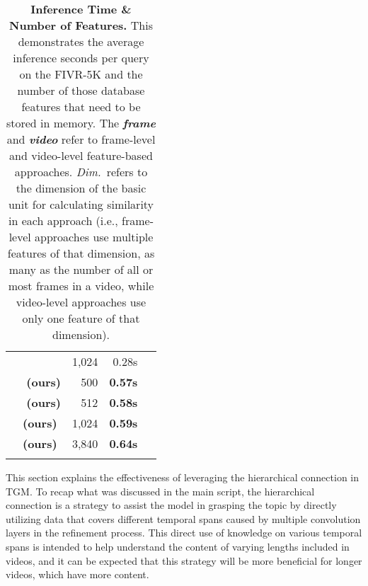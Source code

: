 \documentclass[10pt,twocolumn,letterpaper]{article}
\begin{document}
\begin{table}[!t]
\begin{center}
\begin{tabular}{@{}clrrc@{}}
             & ~\cite{shao2021temporal}  & 1,024 & 0.28s\;\;\;\;\, & \\ \cmidrule(lr){2-4}
             &  \,\,\textbf{(ours)} & 500 & \textbf{0.57s}\;\;\;\;\, &  \\
             &  \,\,\textbf{(ours)} & 512 & \textbf{0.58s}\;\;\;\;\, & \\
             &  \textbf{(ours)} & 1,024 & \textbf{0.59s}\;\;\;\;\, & \\
             &  \textbf{(ours)} & 3,840 & \textbf{0.64s}\;\;\;\;\, &  \\
            \cmidrule[\heavyrulewidth]{1-5}
            \morecmidrules
            \cmidrule[\heavyrulewidth]{1-5} 
            \end{tabular}
            \vspace{-0mm}
            \caption{\textbf{Inference Time \& Number of Features.} This demonstrates the average inference seconds per query on the FIVR-5K and the number of those database features that need to be stored in memory. The \textit{\textbf{frame}} and \textit{\textbf{video}} refer to frame-level and video-level feature-based approaches. \textit{Dim.}~refers to the dimension of the basic unit for calculating similarity in each approach (i.e., frame-level approaches use multiple features of that dimension, as many as the number of all or most frames in a video, while video-level approaches use only one feature of that dimension). \vspace{0mm}} \label{tab:speed_mem}
        \end{center}
    \end{table}
    

        This section explains the effectiveness of leveraging the hierarchical connection in TGM. To recap what was discussed in the main script, the hierarchical connection is a strategy to assist the model in grasping the topic by directly utilizing data that covers different temporal spans caused by multiple convolution layers in the refinement process. This direct use of knowledge on various temporal spans is intended to help understand the content of varying lengths included in videos, and it can be expected that this strategy will be more beneficial for longer videos, which have more content.
\end{document}
